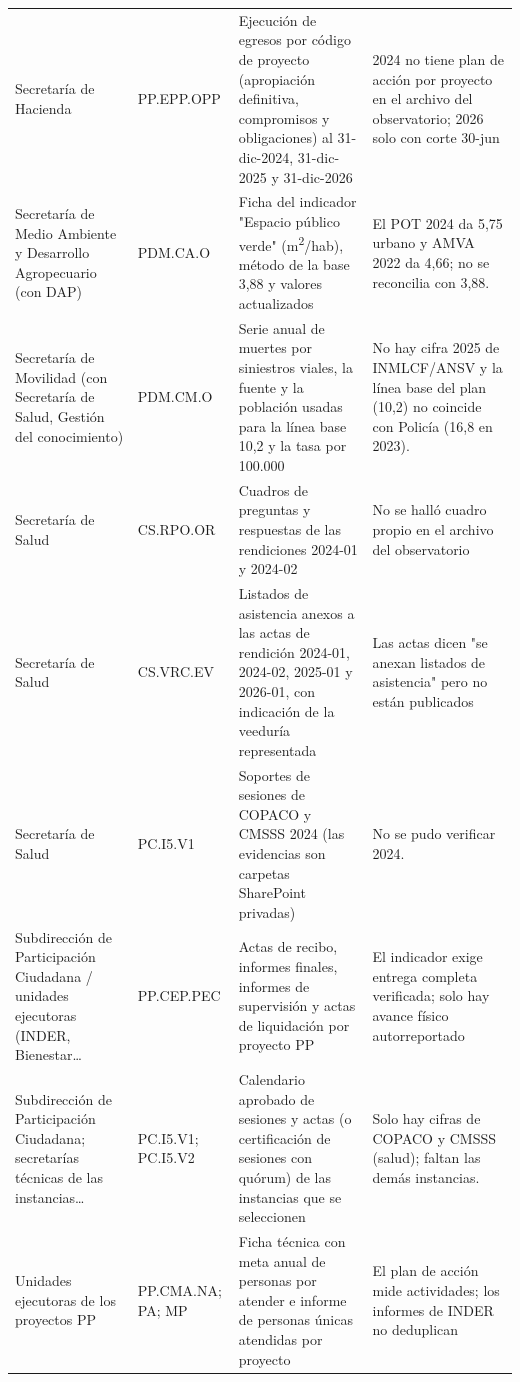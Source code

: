 \documentclass[11pt,letterpaper]{article}
\begin{document}
{\begin{xltabular}{\linewidth}{L{3.4cm}L{2.2cm}YL{3cm}}
Secretaría de Hacienda & PP.EPP.OPP & Ejecución de egresos por código de proyecto (apropiación definitiva, compromisos y obligaciones) al 31-dic-2024, 31-dic-2025 y 31-dic-2026 & 2024 no tiene plan de acción por proyecto en el archivo del observatorio; 2026 solo con corte 30-jun \\
Secretaría de Medio Ambiente y Desarrollo Agropecuario (con DAP) & PDM.CA.O & Ficha del indicador "Espacio público verde" (m\textsuperscript{2}/hab), método de la base 3,88 y valores actualizados & El POT 2024 da 5,75 urbano y AMVA 2022 da 4,66; no se reconcilia con 3,88. \\
Secretaría de Movilidad (con Secretaría de Salud, Gestión del conocimiento) & PDM.CM.O & Serie anual de muertes por siniestros viales, la fuente y la población usadas para la línea base 10,2 y la tasa por 100.000 & No hay cifra 2025 de INMLCF/ANSV y la línea base del plan (10,2) no coincide con Policía (16,8 en 2023). \\
Secretaría de Salud & CS.RPO.OR & Cuadros de preguntas y respuestas de las rendiciones 2024-01 y 2024-02 & No se halló cuadro propio en el archivo del observatorio \\
Secretaría de Salud & CS.VRC.EV & Listados de asistencia anexos a las actas de rendición 2024-01, 2024-02, 2025-01 y 2026-01, con indicación de la veeduría representada & Las actas dicen "se anexan listados de asistencia" pero no están publicados \\
Secretaría de Salud & PC.I5.V1 & Soportes de sesiones de COPACO y CMSSS 2024 (las evidencias son carpetas SharePoint privadas) & No se pudo verificar 2024. \\
Subdirección de Participación Ciudadana / unidades ejecutoras (INDER, Bienestar\ldots{} & PP.CEP.PEC & Actas de recibo, informes finales, informes de supervisión y actas de liquidación por proyecto PP & El indicador exige entrega completa verificada; solo hay avance físico autorreportado \\
Subdirección de Participación Ciudadana; secretarías técnicas de las instancias\ldots{} & PC.I5.V1; PC.I5.V2 & Calendario aprobado de sesiones y actas (o certificación de sesiones con quórum) de las instancias que se seleccionen & Solo hay cifras de COPACO y CMSSS (salud); faltan las demás instancias. \\
Unidades ejecutoras de los proyectos PP & PP.CMA.NA; PA; MP & Ficha técnica con meta anual de personas por atender e informe de personas únicas atendidas por proyecto & El plan de acción mide actividades; los informes de INDER no deduplican \\
\end{xltabular}
}
\end{document}
